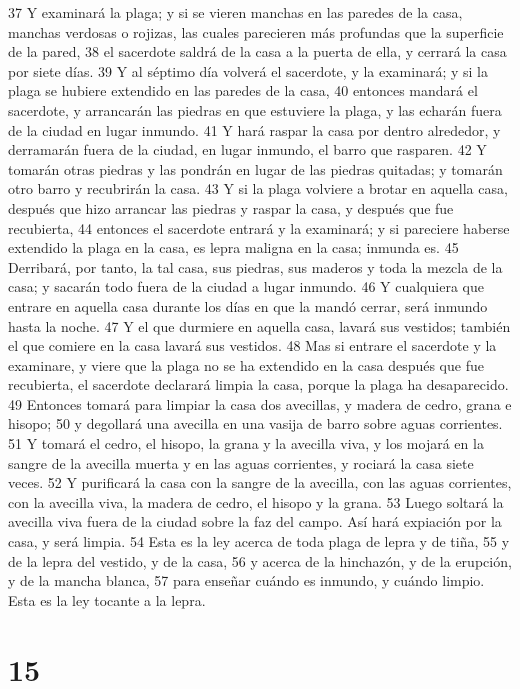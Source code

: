 37 Y examinará la plaga; y si se vieren manchas en las paredes de la casa, manchas verdosas o rojizas, las cuales parecieren más profundas que la superficie de la pared,
38 el sacerdote saldrá de la casa a la puerta de ella, y cerrará la casa por siete días.
39 Y al séptimo día volverá el sacerdote, y la examinará; y si la plaga se hubiere extendido en las paredes de la casa,
40 entonces mandará el sacerdote, y arrancarán las piedras en que estuviere la plaga, y las echarán fuera de la ciudad en lugar inmundo.
41 Y hará raspar la casa por dentro alrededor, y derramarán fuera de la ciudad, en lugar inmundo, el barro que rasparen.
42 Y tomarán otras piedras y las pondrán en lugar de las piedras quitadas; y tomarán otro barro y recubrirán la casa.
43 Y si la plaga volviere a brotar en aquella casa, después que hizo arrancar las piedras y raspar la casa, y después que fue recubierta,
44 entonces el sacerdote entrará y la examinará; y si pareciere haberse extendido la plaga en la casa, es lepra maligna en la casa; inmunda es.
45 Derribará, por tanto, la tal casa, sus piedras, sus maderos y toda la mezcla de la casa; y sacarán todo fuera de la ciudad a lugar inmundo.
46 Y cualquiera que entrare en aquella casa durante los días en que la mandó cerrar, será inmundo hasta la noche.
47 Y el que durmiere en aquella casa, lavará sus vestidos; también el que comiere en la casa lavará sus vestidos.
48 Mas si entrare el sacerdote y la examinare, y viere que la plaga no se ha extendido en la casa después que fue recubierta, el sacerdote declarará limpia la casa, porque la plaga ha desaparecido.
49 Entonces tomará para limpiar la casa dos avecillas, y madera de cedro, grana e hisopo;
50 y degollará una avecilla en una vasija de barro sobre aguas corrientes.
51 Y tomará el cedro, el hisopo, la grana y la avecilla viva, y los mojará en la sangre de la avecilla muerta y en las aguas corrientes, y rociará la casa siete veces.
52 Y purificará la casa con la sangre de la avecilla, con las aguas corrientes, con la avecilla viva, la madera de cedro, el hisopo y la grana.
53 Luego soltará la avecilla viva fuera de la ciudad sobre la faz del campo. Así hará expiación por la casa, y será limpia.
54 Esta es la ley acerca de toda plaga de lepra y de tiña,
55 y de la lepra del vestido, y de la casa,
56 y acerca de la hinchazón, y de la erupción, y de la mancha blanca,
57 para enseñar cuándo es inmundo, y cuándo limpio. Esta es la ley tocante a la lepra.  

\chapter{15}


